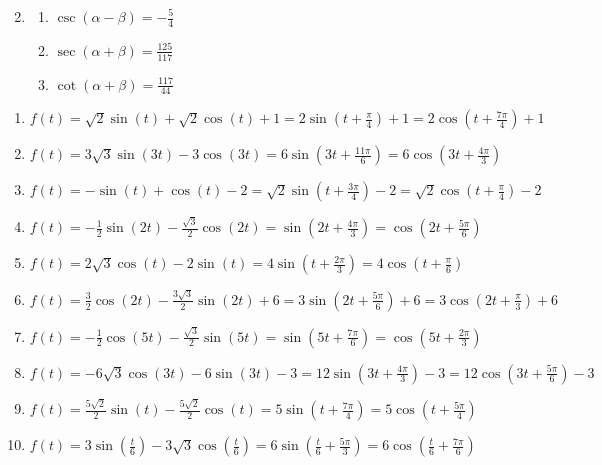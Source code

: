 \begin{enumerate}
\begin{multicols}{3}
\begin{enumerate}
\end{enumerate}

\end{multicols}

 

\item \begin{multicols}{3}

\begin{enumerate}

\item $\csc(\alpha - \beta) = -\frac{5}{4}$
\item $\sec(\alpha + \beta) = \frac{125}{117}$
\item $\cot(\alpha + \beta) = \frac{117}{44}$

\end{enumerate}

\end{multicols}

\setcounter{HW}{\value{enumi}}

\end{enumerate}

\begin{enumerate}
\setcounter{enumi}{\value{HW}}
\item $f(t) = \sqrt{2}\sin(t) + \sqrt{2}\cos(t) + 1 = 2\sin\left(t + \frac{\pi}{4}\right) + 1 = 2\cos\left(t + \frac{7\pi}{4}\right) + 1$ 
\item $f(t) = 3\sqrt{3}\sin(3t) - 3\cos(3t) = 6\sin\left(3t + \frac{11\pi}{6}\right) = 6\cos\left(3t + \frac{4\pi}{3}\right)$
\item $f(t) = -\sin(t) + \cos(t) - 2 = \sqrt{2}\sin\left(t + \frac{3\pi}{4}\right) - 2 = \sqrt{2}\cos\left(t + \frac{\pi}{4}\right) - 2$
\item $f(t) = -\frac{1}{2}\sin(2t) - \frac{\sqrt{3}}{2}\cos(2t) = \sin\left(2t + \frac{4\pi}{3}\right) = \cos\left(2t + \frac{5\pi}{6}\right)$
\item $f(t) = 2\sqrt{3} \cos(t) - 2\sin(t) = 4\sin\left(t+\frac{2\pi}{3}  \right)  = 4\cos\left(t + \frac{\pi}{6}\right)$
\item  $f(t) = \frac{3}{2} \cos(2t) - \frac{3\sqrt{3}}{2} \sin(2t) + 6 =3\sin\left(2t + \frac{5\pi}{6}\right) + 6   = 3\cos\left(2t + \frac{\pi}{3}\right) + 6$
\item  $f(t) = -\frac{1}{2} \cos(5t) -\frac{\sqrt{3}}{2} \sin(5t) =  \sin\left(5t + \frac{7\pi}{6}\right) = \cos\left(5t + \frac{2\pi}{3}\right)$
\item  $f(t) = -6\sqrt{3} \cos(3t) - 6\sin(3t) - 3 = 12\sin\left(3t + \frac{4\pi}{3}\right) - 3 = 12\cos\left(3t + \frac{5\pi}{6}\right) - 3$
\item  $f(t) =  \frac{5\sqrt{2}}{2} \sin(t)  -\frac{5\sqrt{2}}{2} \cos(t) = 5\sin\left(t + \frac{7\pi}{4}\right)= 5\cos\left(t + \frac{5\pi}{4}\right)$
\item  $f(t) =3\sin\left(\frac{t}{6}\right) -3\sqrt{3} \cos\left(\frac{t}{6}\right) = 6\sin\left( \frac{t}{6}+\frac{5\pi}{3}\right)= 6\cos\left( \frac{t}{6}+\frac{7\pi}{6}\right) $

\setcounter{HW}{\value{enumi}}
\end{enumerate}


